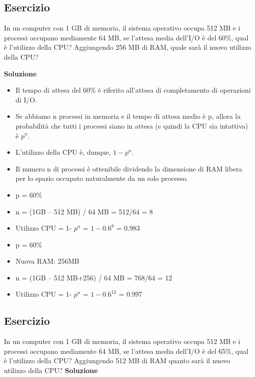 \documentclass{article}
\begin{document}
\subsection{Esercizio}

In un computer con 1 GB di memoria, il sistema operativo occupa 512 MB e i processi occupano mediamente 64 MB, se l’attesa media dell’I/O è del 60\%, qual è l’utilizzo della CPU? Aggiungendo 256 MB di RAM, quale sarà il nuovo utilizzo della CPU? 

\vskip 0.5cm
\textbf{Soluzione}\\

\begin{itemize}
\item Il tempo di attesa del 60\% è riferito all'attesa di completamento di operazioni di I/O.
\item Se abbiamo n processi in memoria e il tempo di attesa medio è p, allora la probabilità che tutti i processi siano in attesa (e quindi la CPU sia intattiva) è $p^n$.
\item L'utilizzo della CPU è, dunque, $1- p^n$.
\item Il numero n di processi è ottenibile dividendo la dimensione di RAM libera per lo spazio occupato naturalmente da un solo processo.
\item p = 60\% 
\item n = (1GB – 512 MB) / 64 MB = 512/64 = 8 
\item Utilizzo CPU = 1- $p^n$ = $1 - 0.6^8$ = 0.983 
\item p = 60\% 
\item Nuova RAM: 256MB 
\item n = (1GB – 512 MB+256) / 64 MB = 768/64 = 12 
\item Utilizzo CPU = 1- $p^n$ = $1 - 0.6^{12}$ = 0.997 
\end{itemize}


\subsection{Esercizio}

In un computer con 1 GB di memoria, il sistema operativo occupa 512 MB e i processi occupano mediamente 64 MB, se l’attesa media dell’I/O è del 65\%, qual è l’utilizzo della CPU? Aggiungendo 512 MB di RAM quanto sarà il nuovo utilizzo della CPU?
\vskip 0.5cm
\textbf{Soluzione}\\
\end{document}
